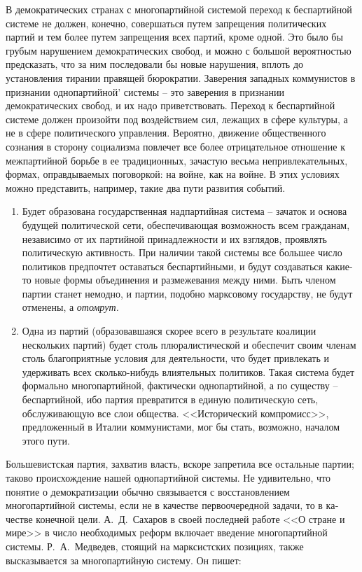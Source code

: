 \documentclass{book}
\begin{document}
В демократических странах с многопартийной системой пе­реход к беспартийной системе не должен, конечно, совершать­ся путем запрещения политических партий и тем более путем запрещения всех партий, кроме одной. Это было бы грубым нарушением демократических свобод, и можно с большой вероятностью предсказать, что за ним последовали бы новые нарушения, вплоть до установления тирании правящей бюрократии. Заверения западных коммунистов в признании однопартийной' системы -- это заверения в признании демократических свобод, и их надо приветствовать. Переход к беспартийной системе должен произойти под воздействием сил, лежащих в сфере культуры, а не в сфере политического управления. Вероятно, движение общественного сознания в сторону социализма повлечет все более отрицательное отношение к межпартийной борьбе в ее традиционных, зачастую весьма непривлекательных, формах, оправдываемых поговоркой: на войне, как на войне. В этих условиях можно представить, например, такие два пути развития событий.

\begin{enumerate}
 \item Будет образована государственная надпартийная систе­ма -- зачаток и основа будущей политической сети, обеспечи­вающая возможность всем гражданам, независимо от их партий­ной принадлежности и их взглядов, проявлять политическую активность. При наличии такой системы все большее число по­литиков предпочтет оставаться беспартийными, и будут созда­ваться какие-то новые формы объединения и размежевания между ними. Быть членом партии станет немодно, и партии, подобно марксовому государству, не будут отменены, а \textit{отомрут.} 
 \item Одна из партий (образовавшаяся скорее всего в резуль­тате коалиции нескольких партий) будет столь плюралисти­ческой и обеспечит своим членам столь благоприятные условия для деятельности, что будет привлекать и удерживать всех сколько-нибудь влиятельных политиков. Такая система будет формально многопартийной, фактически однопартийной, а по существу -- беспартийной, ибо партия превратится в еди­ную политическую сеть, обслуживающую все слои общества. <<Исторический компромисс>>, предложенный в Италии комму­нистами, мог бы стать, возможно, началом этого пути.
\end{enumerate}

Большевистская партия, захватив власть, вскоре запретила все остальные партии; таково происхождение нашей однопар­тийной системы. Не удивительно, что понятие о де\-мо\-кра\-ти\-за\-ции обычно связывается с восстановлением многопартийной системы, если не в качестве первоочередной задачи, то в ка­честве конечной цели. А.~Д.~Сахаров в своей последней работе <<О стране и мире>> в число необходимых реформ включает введение многопартийной системы. Р.~А.~Медведев, стоящий на марксистских позициях, также высказывается за многопартий­ную систему. Он пишет:
\end{document}
